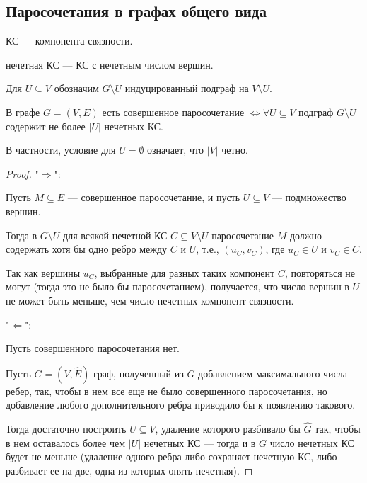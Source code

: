 \begin{normalsize}

\subsection{Паросочетания в графах общего вида}

\begin{notice}
    КС --- компонента связности.

    нечетная КС --- КС с нечетным числом вершин.

    Для $U \subseteq V$ обозначим $G \setminus U$ индуцированный подграф на $V \setminus U$.
\end{notice}

\begin{theorem}
    В графе $G = (V, E)$ есть совершенное паросочетание $\iff \forall U \subseteq V$ подграф $G \setminus U$ содержит не более $|U|$ нечетных КС.

    В частности, условие для $U = \emptyset$ означает, что $|V|$ четно.
\end{theorem}

\begin{proof}
    
    "$\Rightarrow$":

    Пусть $M \subseteq E$ --- совершенное паросочетание, и пусть $U \subseteq V$ --- подмножество вершин.

    Тогда в $G \setminus U$ для всякой нечетной КС $C \subseteq V \setminus U$ паросочетание $M$ должно содержать хотя бы одно ребро между $C$ и $U$, т.е., $(u_C, v_C)$, где $u_C \in U$ и $v_C \in C$.

    Так как вершины $u_C$, выбранные для разных таких компонент $C$, повторяться не могут (тогда это не было бы паросочетанием), получается, что число вершин в $U$ не может быть меньше, чем число нечетных компонент связности.

    "$\Leftarrow$":

    Пусть совершенного паросочетания нет.

    Пусть $\hat{G} = (V, \hat{E})$ граф, полученный из $G$ добавлением максимального числа ребер, так, чтобы в нем все еще не было совершенного паросочетания, но добавление любого дополнительного ребра приводило бы к появлению такового.

    Тогда достаточно построить $U \subseteq V$, удаление которого разбивало бы $\hat{G}$ так, чтобы в нем оставалось более чем $|U|$ нечетных КС --- тогда и в $G$ число нечетных КС будет не меньше (удаление одного ребра либо сохраняет нечетную КС, либо разбивает ее на две, одна из которых опять нечетная).


\end{proof}
\end{normalsize}
